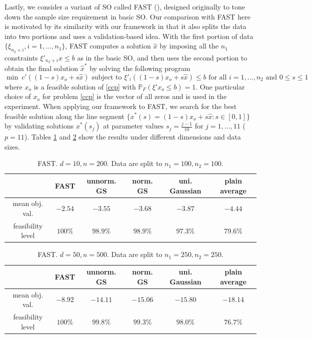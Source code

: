 \documentclass[mnsc,blindrev]{informs4} %
\begin{document}
Lastly, we consider a variant of SO called FAST (\cite{care2014fast}), designed originally to tone down the sample size requirement in basic SO. Our comparison with FAST here is motivated by its similarity with our framework in that it also splits the data into two portions and uses a validation-based idea. With the first portion of data $\{\xi_{n_2+i},i=1,\ldots,n_1\}$, FAST computes a solution $\hat x$ by imposing all the $n_1$ constraints $\xi'_{n_2+i}x\leq b$ as in the basic SO, and then uses the second portion to obtain the final solution $\hat x^*$ by solving the following program
\begin{equation*}
\min\  c'((1-s)x_o+s\hat x)\text{\ \ subject to\ \ }\xi'_i((1-s)x_o+s\hat x)\leq b\text{ for all }i=1,\ldots,n_2\text{ and }0\leq s\leq 1
\end{equation*}
where $x_o$ is a feasible solution of \eqref{ccp} with $\mathbb P_F(\xi'x_o\leq b)=1$. One particular choice of $x_o$ for problem \eqref{ccp} is the vector of all zeros and is used in the experiment. When applying our framework to FAST, we search for the best feasible solution along the line segment $\{x^*(s)=(1-s)x_o+s\hat x:s\in[0,1]\}$ by validating solutions $x^*(s_j)$ at parameter values $s_j=\frac{j-1}{10}$ for $j=1,\ldots,11$ ($p=11$). Tables \ref{FAST_10_200} and \ref{FAST_50_500} show the results under different dimensions and data sizes.

\begin{table}[h]
\caption{FAST. $d=10,n=200$. Data are split to $n_1=100,n_2=100$.}
\begin{center}
\begin{tabular}{|c|c|c|c|c|c|}
\hline
&FAST&unnorm. GS&norm. GS&uni. Gaussian&plain average\\\hline
mean obj. val.&$-2.54$&$-3.55$&$-3.68$&$-3.87$&$-4.44$\\\hline
feasibility level&$100\%$&$98.9\%$&$98.9\%$&$97.3\%$&$79.6\%$\\\hline
\end{tabular}
\end{center}
\label{FAST_10_200}
\end{table}%

\begin{table}[h]
\caption{FAST. $d=50,n=500$. Data are split to $n_1=250,n_2=250$.}
\begin{center}
\begin{tabular}{|c|c|c|c|c|c|}
\hline
&FAST&unnorm. GS&norm. GS&uni. Gaussian&plain average\\\hline
mean obj. val.&$-8.92$&$-14.11$&$-15.06$&$-15.80$&$-18.14$\\\hline
feasibility level&$100\%$&$99.8\%$&$99.3\%$&$98.0\%$&$76.7\%$\\\hline
\end{tabular}
\end{center}
\label{FAST_50_500}
\end{table}%
\end{document}
